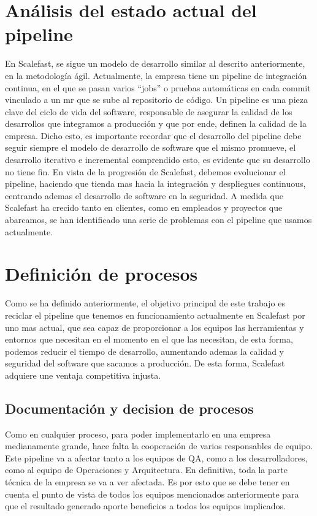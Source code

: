 \documentclass[12pt]{report} %
\begin{document}
\section{Análisis del estado actual del pipeline} %

En Scalefast, se sigue un modelo de desarrollo similar al descrito anteriormente, en la metodología ágil.
Actualmente, la empresa tiene un pipeline de integración continua, en el que se pasan varios ``jobs'' o pruebas automáticas en cada commit vinculado a un \acrfull{mr} que se sube al repositorio de código.
Un pipeline es una pieza clave del ciclo de vida del software, responsable de asegurar la calidad de los desarrollos que integramos a producción y que por ende, definen la calidad de la empresa.
Dicho esto, es importante recordar que el desarrollo del pipeline debe seguir siempre el modelo de desarrollo de software que el mismo promueve, el desarrollo iterativo e incremental comprendido esto, es evidente que su desarrollo no tiene fin.
En vista de la progresión de Scalefast, debemos evolucionar el pipeline, haciendo que tienda mas hacia la integración y despliegues continuous, centrando ademas el desarrollo de software en la seguridad.
A medida que Scalefast ha crecido tanto en clientes, como en empleados y proyectos que abarcamos, se han identificado una serie de problemas con el pipeline que usamos actualmente.

\section{Definición de procesos}

Como se ha definido anteriormente, el objetivo principal de este trabajo es reciclar el pipeline que tenemos en funcionamiento actualmente en Scalefast por uno mas actual, que sea capaz de proporcionar a los equipos las herramientas y entornos que necesitan en el momento en el que las necesitan, de esta forma, podemos reducir el tiempo de desarrollo, aumentando ademas la calidad y seguridad del software que sacamos a producción.
De esta forma, Scalefast adquiere une ventaja competitiva injusta.

\subsection{Documentación y decision de procesos}

Como en cualquier proceso, para poder implementarlo en una empresa medianamente grande, hace falta la cooperación de varios responsables de equipo.
Este pipeline va a afectar tanto a los equipos de QA, como a los desarrolladores, como al equipo de Operaciones y Arquitectura.
En definitiva, toda la parte técnica de la empresa se va a ver afectada.
Es por esto que se debe tener en cuenta el punto de vista de todos los equipos mencionados anteriormente para que el resultado generado aporte beneficios a todos los equipos implicados.
\end{document}

